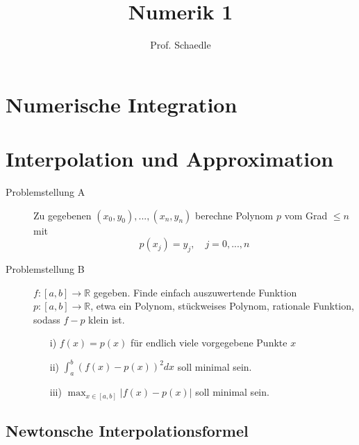 \documentclass[12pt]{article}
\author{Prof. Schaedle}
\title{Numerik 1}
\theoremstyle{break}
\begin{document}
\maketitle

\newpage

\tableofcontents
\newpage

\section{Numerische Integration}


\section{Interpolation und Approximation}

\begin{description}
  \item[Problemstellung A]
    Zu gegebenen $(x_0, y_0), ...,(x_n, y_n)$ berechne Polynom $p$ vom Grad $\leq n$ mit $$p(x_j) = y_j, \quad j=0,...,n$$
  
  \item[Problemstellung B]
    $f:[a,b] \rightarrow \mathbb{R}$ gegeben. Finde einfach auszuwertende Funktion $p: [a,b] \rightarrow \mathbb{R}$, etwa ein Polynom, stückweises Polynom, rationale Funktion, sodass $f-p$ klein ist.
    \begin{enumerate}
      \item[i)] $f(x)=p(x)$ für endlich viele vorgegebene Punkte $x$
      \item[ii)] $\int_a^b (f(x)-p(x))^2 dx$ soll minimal sein.
      \item[iii)] $\max_{x \in [a,b]} \vert f(x) -p(x) \vert$ soll minimal sein.
    \end{enumerate}
\end{description}

\subsection{Newtonsche Interpolationsformel}
\end{document}
